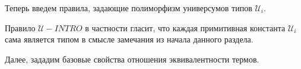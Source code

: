 \documentclass{article}[12pt]
\begin{document}
Теперь введем правила, задающие полиморфизм универсумов типов $\mathcal U_i$.
\begin{multicols}{2}
    \begin{prooftree}
    \end{prooftree}
    \begin{prooftree}
    \end{prooftree}
\end{multicols}
Правило $\mathcal U-INTRO$ в частности гласит, что каждая примитивная константа $\mathcal U_i$ сама является
типом в смысле замечания из начала данного раздела.

Далее, зададим базовые свойства отношения эквивалентности термов.
\begin{multicols}{2}
    \begin{prooftree}
    \end{prooftree}
    \begin{prooftree}
    \end{prooftree}
\end{multicols}
\begin{prooftree}
\end{prooftree}
\begin{multicols}{2}
    \begin{prooftree}
    \end{prooftree}
    \begin{prooftree}
    \end{prooftree}
\end{multicols}
\end{document}
